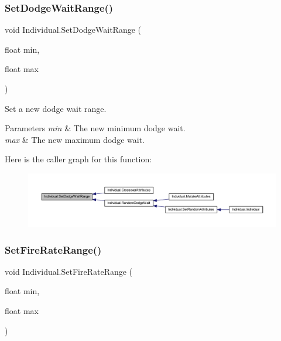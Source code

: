 \subsubsection{\texorpdfstring{Set\+Dodge\+Wait\+Range()}{SetDodgeWaitRange()}}
{\footnotesize\ttfamily void Individual.\+Set\+Dodge\+Wait\+Range (\begin{DoxyParamCaption}\item[{float}]{min,  }\item[{float}]{max }\end{DoxyParamCaption})}



Set a new dodge wait range. 


\begin{DoxyParams}{Parameters}
{\em min} & The new minimum dodge wait.\\
\hline
{\em max} & The new maximum dodge wait.\\
\hline
\end{DoxyParams}
Here is the caller graph for this function\+:\nopagebreak
\begin{figure}[H]
\begin{center}
\leavevmode
\includegraphics[width=350pt]{class_individual_a31ca5e7277bc5f8cbe48bde294590095_icgraph}
\end{center}
\end{figure}
\mbox{\label{class_individual_ab9a068a2aeac06fc33a22391dba7559a}} 
\subsubsection{\texorpdfstring{Set\+Fire\+Rate\+Range()}{SetFireRateRange()}}
{\footnotesize\ttfamily void Individual.\+Set\+Fire\+Rate\+Range (\begin{DoxyParamCaption}\item[{float}]{min,  }\item[{float}]{max }\end{DoxyParamCaption})}



